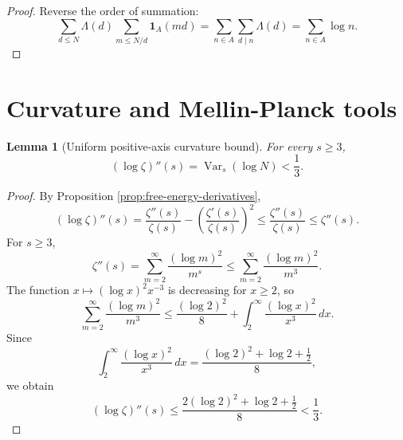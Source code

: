 \documentclass[11pt]{article}
\numberwithin{equation}{section}
\newtheorem{lemma}[theorem]{Lemma}
\theoremstyle{definition}
\theoremstyle{remark}
\DeclareMathOperator{\Var}{Var}
\newcommand{\1}{\mathbf 1}
\begin{document}
\begin{proof}
Reverse the order of summation:
\begin{equation}
\label{eq:finite-euler-score-proof}
\sum_{d\le N}\Lambda(d)\sum_{m\le N/d}\1_A(md)
=\sum_{n\in A}\sum_{d\mid n}\Lambda(d)
=\sum_{n\in A}\log n.
\end{equation}
\end{proof}

\section{Curvature and Mellin-Planck tools}

\begin{lemma}[Uniform positive-axis curvature bound]
\label{lem:uniform-positive-axis-curvature}
For every \(s\ge3\),
\begin{equation}
\label{eq:uniform-curvature-bound}
(\log\zeta)''(s)=\Var_s(\log N)<\frac13.
\end{equation}
\end{lemma}

\begin{proof}
By Proposition \ref{prop:free-energy-derivatives},
\begin{equation}
\label{eq:curvature-first-bound}
(\log\zeta)''(s)
=\frac{\zeta''(s)}{\zeta(s)}
-\left(\frac{\zeta'(s)}{\zeta(s)}\right)^2
\le \frac{\zeta''(s)}{\zeta(s)}
\le \zeta''(s).
\end{equation}
For \(s\ge3\),
\begin{equation}
\label{eq:zeta-second-derivative-bound}
\zeta''(s)=\sum_{m=2}^{\infty}\frac{(\log m)^2}{m^s}
\le\sum_{m=2}^{\infty}\frac{(\log m)^2}{m^3}.
\end{equation}
The function \(x\mapsto(\log x)^2x^{-3}\) is decreasing for \(x\ge2\), so
\begin{equation}
\label{eq:curvature-integral-comparison}
\sum_{m=2}^{\infty}\frac{(\log m)^2}{m^3}
\le
\frac{(\log2)^2}{8}
+\int_2^\infty\frac{(\log x)^2}{x^3}\,dx.
\end{equation}
Since
\begin{equation}
\label{eq:curvature-integral-value}
\int_2^\infty\frac{(\log x)^2}{x^3}\,dx
=\frac{(\log2)^2+\log2+\frac12}{8},
\end{equation}
we obtain
\begin{equation}
\label{eq:curvature-final-bound}
(\log\zeta)''(s)
\le
\frac{2(\log2)^2+\log2+\frac12}{8}
<\frac13.
\end{equation}
\end{proof}
\end{document}
